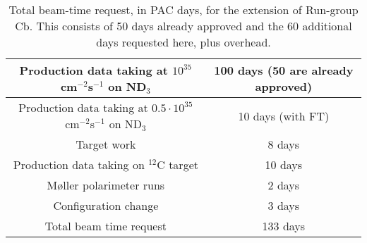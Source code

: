 
\begin{table}
\begin{center}
\begin{tabular}{|c||c|}
\hline
Production data taking at $10^{35}$ cm$^{-2}$s$^{-1}$ on ND$_3$ & 100 days (50 are already approved)\\
\hline
Production data taking at $0.5 \cdot 10^{35}$ cm$^{-2}$s$^{-1}$ on ND$_3$ & 10 days (with FT)\\
\hline
Target work & 8 days\\
\hline
Production data taking on $^{12}$C target & 10 days\\
\hline 
M\o ller polarimeter runs & 2 days\\
\hline
Configuration change & 3 days \\
\hline
\hline
Total beam time request & 133 days\\
\hline
\end{tabular}
\caption{Total beam-time request, in PAC days, for the extension of Run-group Cb. This consists of 50 days already approved and the 60 additional days requested here, plus overhead.}
\label{beam_time}
\end{center}
\end{table}


